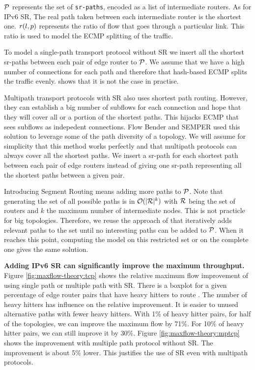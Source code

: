 $\P$ represents the set of \texttt{sr-paths}, encoded as a list of intermediate routers.
As for IPv6 SR, The real path taken between each intermediate router is the shortest one.
$\r(l, p)$ represents the ratio of flow that goes through a particular link.
This ratio is used to model the ECMP splitting of the traffic.

To model a single-path transport protocol without SR
we insert all the shortest sr-paths between each pair of edge router to $\P$.
We assume that we have a high number of connections for each path
and therefore that hash-based ECMP splits the traffic evenly.
\cite{ecmphashperf} shows that it is not the case in practise.

Multipath transport protocols with SR also uses shortest path routing.
However, they can establish a big number of subflows for each connection
and hope that they will cover all or a portion of the shortest paths.
This hijacks ECMP that sees subflows as indepedent connections.
Flow Bender and SEMPER used this solution to leverage
some of the path diversity of a topology.
We will assume for simplicity that this method works perfectly and that multipath protocols
can always cover all the shortest paths.
We insert a sr-path for each shortest path between each pair of edge routers
instead of giving one sr-path representing all the shortest paths between a given pair. 

Introducing Segment Routing means adding more paths to $\P$.
Note that generating the set of all possible paths is in $\O(|\R|^k)$
with $\R$ being the set of routers and $k$ the maximum number of intermediate nodes.
This is not practicle for big topologies.
Therefore, we reuse the approach of \cite{cg4sr} that iteratively adds relevant paths to the set
until no interesting paths can be added to $\P$.
When it reaches this point, computing the model on this restricted set or on the complete one
gives the same solution.

\textbf{Adding IPv6 SR can significantly improve the maximum throughput.}
Figure \ref{fig:maxflow-theory:tcp} shows the relative maximum flow improvement
of using single path or multiple path with SR.
There is a boxplot for a given percentage of edge router pairs that have heavy hitters
to route .
The number of heavy hitters has influence on the relative improvement.
It is easier to unused alternative paths with fewer heavy hitters.
With 1\% of heavy hitter pairs, for half of the topologies,
we can improve the maximum flow by 71\%.
For 10\% of heavy hitter pairs, we can still improve it by 30\%.
Figure \ref{fig:maxflow-theory:mptcp} shows the improvement with multiple path protocol
without SR.
The improvement is about 5\% lower. This justifies the use of SR even with multipath protocols.

